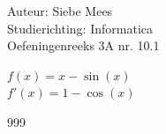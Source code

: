 \documentclass[a4paper]{article}
\begin{document}
  
\noindent \large Auteur: Siebe Mees \\
\noindent \large Studierichting: Informatica\\
\noindent \large Oefeningenreeks 3A nr. 10.1\\

\medskip

\normalsize

$ f(x) = x - \sin(x) $ \\

$ f'(x)  = 1 - \cos(x) $ \\

\begin{thebibliography}{999}
\end{thebibliography}
\end{document}
